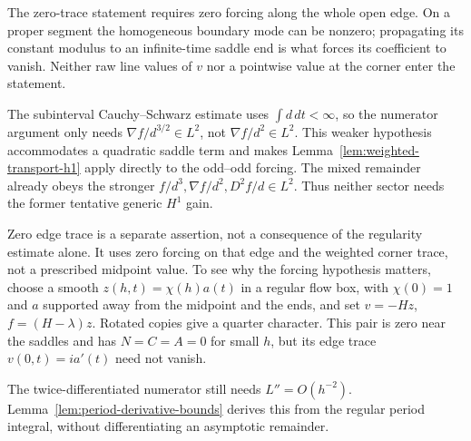 \begin{remark}
The zero-trace statement requires zero forcing along the whole open edge.
On a proper segment the homogeneous boundary mode can be nonzero;
propagating its constant modulus to an infinite-time saddle end is what
forces its coefficient to vanish. Neither raw line values of $v$ nor
a pointwise value at the corner enter the statement.
\end{remark}

\begin{remark}
The subinterval Cauchy--Schwarz estimate uses $\int d\,dt<\infty$, so the
numerator argument only needs $\nabla f/d^{3/2}\in L^2$, not
$\nabla f/d^2\in L^2$. This weaker hypothesis accommodates a quadratic
saddle term and makes Lemma~\ref{lem:weighted-transport-h1} apply directly
to the odd--odd forcing. The mixed remainder already obeys the stronger
$f/d^3,\nabla f/d^2,D^2f/d\in L^2$. Thus neither sector needs the former
tentative generic $H^1$ gain.

Zero edge trace is a separate assertion, not a consequence of the
regularity estimate alone. It uses zero forcing on that edge and the
weighted corner trace, not a prescribed midpoint value. To see why the
forcing hypothesis matters, choose a smooth $z(h,t)=\chi(h)a(t)$ in a
regular flow box, with $\chi(0)=1$ and $a$ supported away from the midpoint
and the ends, and set $v=-Hz$, $f=(H-\lambda)z$. Rotated copies give a
quarter character. This pair is zero near the saddles and has $N=C=A=0$
for small $h$, but its edge trace $v(0,t)=ia'(t)$ need not vanish.

The twice-differentiated numerator still needs $L''=O(h^{-2})$.
Lemma~\ref{lem:period-derivative-bounds} derives this from the regular
period integral, without differentiating an asymptotic remainder.
\end{remark}
